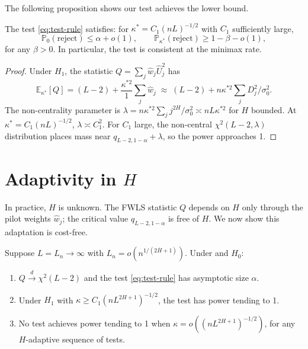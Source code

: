 \documentclass[10pt,a4paper,twocolumn]{article}
\newcommand{\E}{\mathbb{E}}
\newcommand{\Prob}{\mathbb{P}}
\newcommand{\dto}{\xrightarrow{d}}
\begin{document}
The following proposition shows our test achieves the lower bound.

\begin{proposition}[Attainability]
\label{prop:upper-bound}
The test \eqref{eq:test-rule} satisfies: for $\kappa^* = C_1 (nL)^{-1/2}$
with $C_1$ sufficiently large,
\[
    \Prob_0(\text{reject}) \leq \alpha + o(1),\qquad
    \Prob_{\kappa^*}(\text{reject}) \geq 1 - \beta - o(1),
\]
for any $\beta > 0$.  In particular, the test is consistent at the
minimax rate.
\end{proposition}

\begin{proof}
Under $H_1$, the statistic $Q = \sum_j \hat w_j \hat U_j^2$ has
\[
    \E_{\kappa^*}[Q] = (L-2) + \frac{\kappa^{*2}}{1} \sum_j \hat w_j
    \;\approx\; (L-2) + n\kappa^{*2} \sum_j D_j^2/\sigma_0^2.
\]
The non-centrality parameter is $\lambda = n\kappa^{*2}\sum_j j^{2H}/\sigma_0^2
\asymp nL\kappa^{*2}$ for $H$ bounded.  At $\kappa^* = C_1(nL)^{-1/2}$,
$\lambda \asymp C_1^2$.  For $C_1$ large, the non-central $\chi^2(L-2,\lambda)$
distribution places mass near $q_{L-2,1-\alpha} + \lambda$, so the power
approaches 1.
\end{proof}

\section{Adaptivity in $H$}
\label{sec:adaptivity}

In practice, $H$ is unknown.  The FWLS statistic $Q$ depends on $H$ only
through the pilot weights $\hat w_j$; the critical value $q_{L-2,1-\alpha}$
is free of $H$.  We now show this adaptation is cost-free.

\begin{theorem}
\label{thm:adaptivity}
Suppose $L = L_n \to \infty$ with $L_n = o(n^{1/(2\overline{H}+1)})$.
Under  and $H_0$:
\begin{enumerate}[label=(\alph*)]
    \item $Q \dto \chi^2(L-2)$ and the test \eqref{eq:test-rule} has
    asymptotic size $\alpha$.
    \item Under $H_1$ with $\kappa \geq C_1 (nL^{2H+1})^{-1/2}$, the test
    has power tending to 1.
    \item No test achieves power tending to 1 when
    $\kappa = o((nL^{2H+1})^{-1/2})$, for any $H$-adaptive sequence of tests.
\end{enumerate}
\end{theorem}
\end{document}

